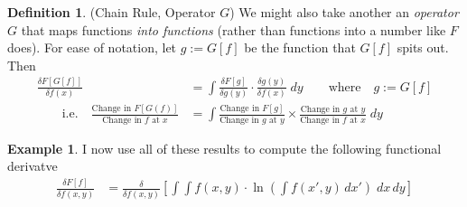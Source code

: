 \documentclass[12pt]{article}
\theoremstyle{plain}
\theoremstyle{definition}
\newtheorem{defn}[thm]{Definition}
\newtheorem{ex}[thm]{Example}
\theoremstyle{remark}
\begin{document}
\begin{defn}(Chain Rule, Operator $G$)
We might also take another an \emph{operator} $G$ that maps functions
\emph{into functions} (rather than functions into a number like $F$
does).
For ease of notation, let $g := G[f]$ be the function that $G[f]$
spits out. Then
\begin{align*}
  \frac{\delta F[G[f]]}{\delta f(x)}
  &=\int
  \frac{\delta F[g]}{\delta g(y)}
  \cdot
  \frac{\delta g(y)}{\delta f(x)} \; dy
  \qquad \text{where}\quad
  g := G[f]
  \\
  \qquad \text{i.e.}\quad
  \frac{\text{Change in $F[G(f)]$}}{\text{Change in $f$ at $x$}}
  &=
  \int
  \frac{\text{Change in $F[g]$}}{\text{Change in $g$ at $y$}}
  \times
  \frac{\text{Change in $g$ at $y$}}{\text{Change in $f$ at $x$}}
  \;dy
\end{align*}
\end{defn}


\begin{ex}
I now use all of these results to compute the following functional
derivatve
\begin{align*}
  \frac{\delta F[f]}{\delta f(x,y)}
  &=
  \frac{\delta}{\delta f(x,y)}
  \left[
  \int\int
  f(x,y)\cdot
  \ln\left( \int f(x',y) \, dx'\right)
  \; dx\,dy
  \right]
\end{align*}
\end{ex}

\end{document}
